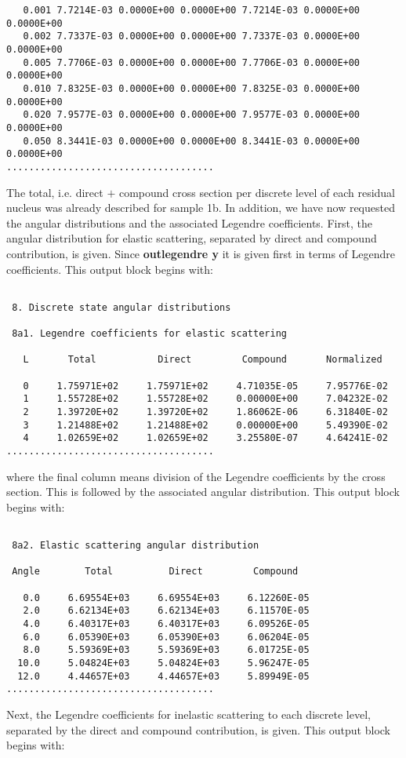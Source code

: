 \begin{samplecase}
{\begin{verbatim}
   0.001 7.7214E-03 0.0000E+00 0.0000E+00 7.7214E-03 0.0000E+00 0.0000E+00
   0.002 7.7337E-03 0.0000E+00 0.0000E+00 7.7337E-03 0.0000E+00 0.0000E+00
   0.005 7.7706E-03 0.0000E+00 0.0000E+00 7.7706E-03 0.0000E+00 0.0000E+00
   0.010 7.8325E-03 0.0000E+00 0.0000E+00 7.8325E-03 0.0000E+00 0.0000E+00
   0.020 7.9577E-03 0.0000E+00 0.0000E+00 7.9577E-03 0.0000E+00 0.0000E+00
   0.050 8.3441E-03 0.0000E+00 0.0000E+00 8.3441E-03 0.0000E+00 0.0000E+00
.....................................
\end{verbatim} } \renewcommand{\baselinestretch}{1.07}\small\normalsize
\noindent
The total, i.e. direct $+$ compound cross section per discrete level of 
each residual nucleus was already described for sample 1b. In addition, we have
now requested the angular distributions and the associated Legendre 
coefficients. 
First, the angular distribution for elastic scattering, separated by direct and 
compound contribution, is given. Since {\bf outlegendre y} it is given first in 
terms of Legendre coefficients. This output block begins with:

{\small \begin{verbatim}

 8. Discrete state angular distributions

 8a1. Legendre coefficients for elastic scattering

   L       Total           Direct         Compound       Normalized

   0     1.75971E+02     1.75971E+02     4.71035E-05     7.95776E-02
   1     1.55728E+02     1.55728E+02     0.00000E+00     7.04232E-02
   2     1.39720E+02     1.39720E+02     1.86062E-06     6.31840E-02
   3     1.21488E+02     1.21488E+02     0.00000E+00     5.49390E-02
   4     1.02659E+02     1.02659E+02     3.25580E-07     4.64241E-02
.....................................
\end{verbatim} } \renewcommand{\baselinestretch}{1.07}\small\normalsize
\noindent
where the final column means division of the Legendre coefficients by the
cross section.
This is followed by the associated angular distribution. This output block 
begins with:

{\small \begin{verbatim}

 8a2. Elastic scattering angular distribution

 Angle        Total          Direct         Compound

   0.0     6.69554E+03     6.69554E+03     6.12260E-05
   2.0     6.62134E+03     6.62134E+03     6.11570E-05
   4.0     6.40317E+03     6.40317E+03     6.09526E-05
   6.0     6.05390E+03     6.05390E+03     6.06204E-05
   8.0     5.59369E+03     5.59369E+03     6.01725E-05
  10.0     5.04824E+03     5.04824E+03     5.96247E-05
  12.0     4.44657E+03     4.44657E+03     5.89949E-05
.....................................
\end{verbatim} } \renewcommand{\baselinestretch}{1.07}\small\normalsize
\noindent
Next, the Legendre coefficients for inelastic scattering to each discrete
level, separated by the direct and 
compound contribution, is given. This output block begins with:


\end{samplecase}
